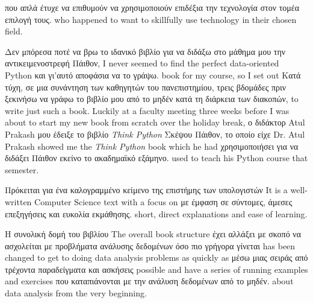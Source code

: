 που απλά έτυχε να επιθυμούν να χρησιμοποιούν επιδέξια την τεχνολογία στον τομέα επιλογή τους.
who happened to want to skillfully use technology in their chosen field.

Δεν μπόρεσα ποτέ να βρω το ιδανικό βιβλίο για να διδάξω στο μάθημα μου την αντικειμενοστρεφή Πάιθον,
I never seemed to find the perfect data-oriented Python
και γι'αυτό αποφάσια να το γράψω.
book for my course, so I set out 
Κατά τύχη, σε μια συνάντηση των καθηγητών του πανεπιστημίου, τρεις βδομάδες πριν ξεκινήσω να γράφω το βιβλίο μου από το μηδέν κατά τη διάρκεια των διακοπών, 
to write just such a book.  Luckily at a faculty meeting three weeks
before I was about to start my new book from scratch over 
the holiday break, 
ο διδάκτορ Atul Prakash μου έδειξε το βιβλίο \emph{Think Python} Σκέψου Πάιθον, το οποίο είχε   
Dr. Atul Prakash showed me the \emph{Think Python} book which he had
χρησιμοποιήσει για να διδάξει Πάιθον εκείνο το ακαδημαϊκό εξάμηνο.
used to teach his Python course that semester.  

Πρόκειται για ένα καλογραμμένο κείμενο της επιστήμης των υπολογιστών 
It is a well-written Computer Science text with a focus on 
με έμφαση σε σύντομες, άμεσες επεξηγήσεις και ευκολία εκμάθησης.
short, direct explanations and ease of learning.  

Η συνολική δομή του βιβλίου
The overall book structure
έχει αλλάξει με σκοπό να ασχολείται με προβλήματα ανάλυσης δεδομένων όσο πιο γρήγορα γίνεται
has been changed to get to doing data analysis problems as quickly as
μέσω μιας σειράς από τρέχοντα παραδείγματα και ασκήσεις
possible and have a series of running examples and exercises 
που καταπιάνονται με την ανάλυση δεδομένων από το μηδέν.
about data analysis from the very beginning.  

